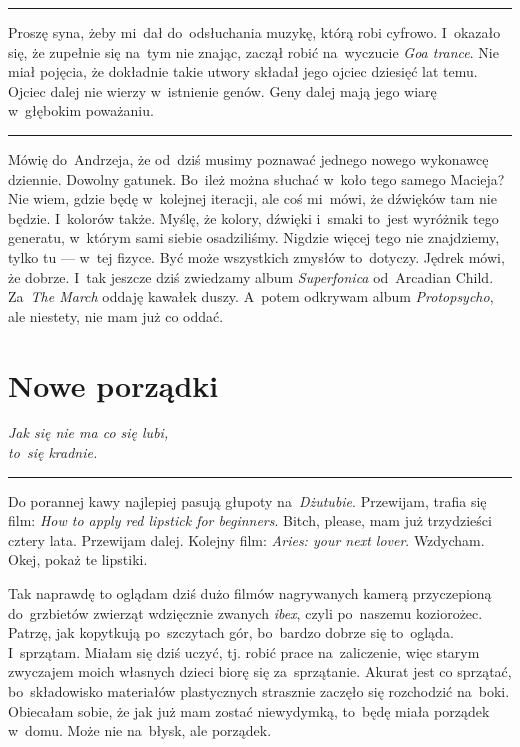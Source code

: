 \documentclass[9pt, a5paper]{memoir}
\begin{document}
\fancybreak{* \quad * \quad *}

Proszę syna, żeby mi~dał do~odsłuchania muzykę, którą robi cyfrowo. I~okazało się, że zupełnie się na~tym nie znając, zaczął robić na~wyczucie \textit{Goa trance}. Nie miał pojęcia, że dokładnie takie utwory składał jego ojciec dziesięć lat temu. Ojciec dalej nie wierzy w~istnienie genów. Geny dalej mają jego wiarę w~głębokim poważaniu.

\fancybreak{* \quad * \quad *}

Mówię do~Andrzeja, że od~dziś musimy poznawać jednego nowego wykonawcę dziennie. Dowolny gatunek. Bo~ileż można słuchać w~koło tego samego Macieja? Nie wiem, gdzie będę w~kolejnej iteracji, ale coś mi~mówi, że dźwięków tam nie będzie. I~kolorów także. Myślę, że kolory, dźwięki i~smaki to~jest wyróżnik tego generatu, w~którym sami siebie osadziliśmy. Nigdzie więcej tego nie znajdziemy, tylko tu --- w~tej fizyce. Być może wszystkich zmysłów to~dotyczy. Jędrek mówi, że dobrze. I~tak jeszcze dziś zwiedzamy album \textit{Superfonica} od~Arcadian Child. Za~\textit{The March} oddaję kawałek duszy. A~potem odkrywam album \textit{Protopsycho}, ale niestety, nie mam już co oddać.

\newpage
\section{Nowe porządki}
{
\itshape
Jak się nie ma co się lubi,\\
to~się kradnie.
}

\fancybreak{* \quad * \quad *}

Do porannej kawy najlepiej pasują głupoty na~\textit{Dżutubie}. Przewijam, trafia się film: \textit{How to apply red lipstick for beginners}. Bitch, please, mam już trzydzieści cztery lata. Przewijam dalej. Kolejny film: \textit{Aries: your next lover}. Wzdycham. Okej, pokaż te lipstiki.

Tak naprawdę to oglądam dziś dużo filmów nagrywanych kamerą przyczepioną do~grzbietów zwierząt wdzięcznie zwanych \textit{ibex}, czyli po~naszemu koziorożec. Patrzę, jak kopytkują po~szczytach gór, bo~bardzo dobrze się to~ogląda. I~sprzątam. Miałam się dziś uczyć, tj. robić prace na~zaliczenie, więc starym zwyczajem moich własnych dzieci biorę się za~sprzątanie. Akurat jest co sprzątać, bo~składowisko materiałów plastycznych strasznie zaczęło się rozchodzić na~boki. Obiecałam sobie, że jak już mam zostać niewydymką, to~będę miała porządek w~domu. Może nie na~błysk, ale porządek.
\end{document}
